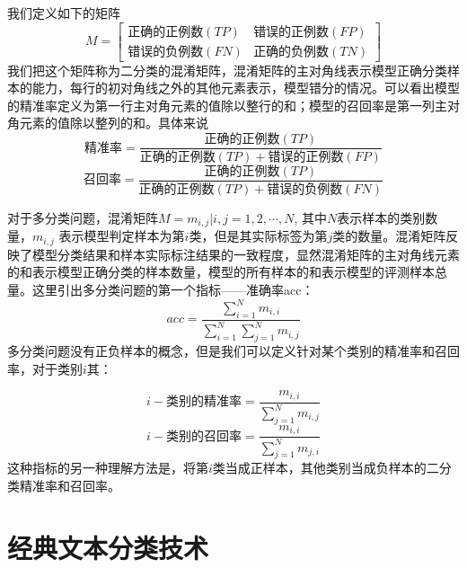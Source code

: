 \documentclass[twoside,a4paper,12pt]{book}%
\begin{document}
\begin{table}[h]
	\caption{文本分类评价指标的关键概念}  
	\centering
\end{table}

我们定义如下的矩阵
$$
M=\left [
\begin{matrix}
\mbox{正确的正例数}(TP) & \mbox{错误的正例数}(FP) \\
\mbox{错误的负例数}(FN) & \mbox{正确的负例数}(TN)
\end{matrix} 
\right ]
$$
我们把这个矩阵称为二分类的混淆矩阵，混淆矩阵的主对角线表示模型正确分类样本的能力，每行的初对角线之外的其他元素表示，模型错分的情况。可以看出模型的精准率定义为第一行主对角元素的值除以整行的和；模型的召回率是第一列主对角元素的值除以整列的和。具体来说
$$
\mbox{精准率}=\frac{\mbox{正确的正例数}(TP)}{\mbox{正确的正例数}(TP) + \mbox{错误的正例数}(FP)} 
$$
$$
\mbox{召回率}=\frac{\mbox{正确的正例数}(TP)}{\mbox{正确的正例数}(TP) + \mbox{错误的负例数}(FN)} 
$$

对于多分类问题，混淆矩阵$M={m_{i,j}|i,j=1,2,\cdots, N}$, 其中$N$表示样本的类别数量，$m_{i,j}$ 表示模型判定样本为第$i$类，但是其实际标签为第$j$类的数量。混淆矩阵反映了模型分类结果和样本实际标注结果的一致程度，显然混淆矩阵的主对角线元素的和表示模型正确分类的样本数量，模型的所有样本的和表示模型的评测样本总量。这里引出多分类问题的第一个指标——准确率acc：
$$
acc = \frac{\sum_{i=1}^{N}m_{i,i}}{\sum_{i=1}^{N}\sum_{j=1}^{N}m_{i,j}} 
$$
多分类问题没有正负样本的概念，但是我们可以定义针对某个类别的精准率和召回率，对于类别$i$其：

$$
i-\mbox{类别的精准率}=\frac{m_{i,i}}{\sum_{j=1}^{N}m_{i,j}} 
$$
$$
i-\mbox{类别的召回率}=\frac{m_{i,i}}{\sum_{j=1}^{N}m_{j,i}} 
$$
这种指标的另一种理解方法是，将第$i$类当成正样本，其他类别当成负样本的二分类精准率和召回率。

\section{经典文本分类技术}
\end{document}
